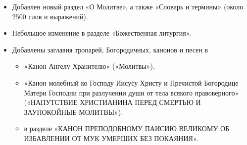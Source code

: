 \begin{itemize}

\item Добавлен новый раздел «О Молитве», а также «Словарь и термины» (около 2500 слов и выражений).

\item Небольшое изменение в разделе «Божественная литургия».

\item Добавлены заглавия тропарей, Богородичных, канонов и песен в

\begin{itemize}

\item «Канон Ангелу Хранителю» («Молитвы»).

\item «Канон молебный ко Господу Иисусу Христу и Пречистой Богородице Матери Господни при разлучении души от тела всякого правоверного» («НАПУТСТВИЕ ХРИСТИАНИНА ПЕРЕД СМЕРТЬЮ И ЗАУПОКОЙНЫЕ МОЛИТВЫ»).

\item в разделе «КАНОН ПРЕПОДОБНОМУ ПАИСИЮ ВЕЛИКОМУ ОБ ИЗБАВЛЕНИИ ОТ МУК УМЕРШИХ БЕЗ ПОКАЯНИЯ».

\end{itemize}
\end{itemize}


